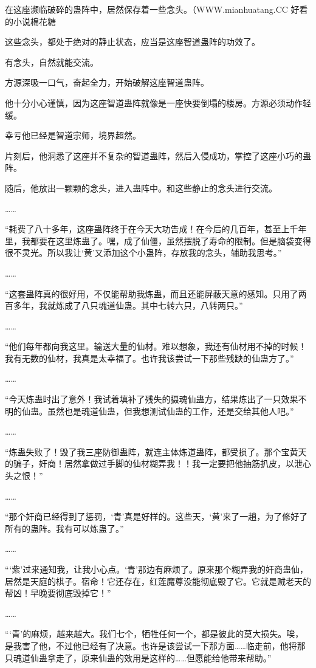 \begin{this_body}
在这座濒临破碎的蛊阵中，居然保存着一些念头。（WWW.mianhuatang.CC 好看的小说棉花糖

这些念头，都处于绝对的静止状态，应当是这座智道蛊阵的功效了。

有念头，自然就能交流。

方源深吸一口气，奋起全力，开始破解这座智道蛊阵。

他十分小心谨慎，因为这座智道蛊阵就像是一座快要倒塌的楼房。方源必须动作轻缓。

幸亏他已经是智道宗师，境界超然。

片刻后，他洞悉了这座并不复杂的智道蛊阵，然后入侵成功，掌控了这座小巧的蛊阵。

随后，他放出一颗颗的念头，进入蛊阵中。和这些静止的念头进行交流。

……

“耗费了八十多年，这座蛊阵终于在今天大功告成！在今后的几百年，甚至上千年里，我都要在这里炼蛊了。嘿，成了仙僵，虽然摆脱了寿命的限制。但是脑袋变得很不灵光。所以我让‘黄’又添加这个小蛊阵，存放我的念头，辅助我思考。”

……

“这套蛊阵真的很好用，不仅能帮助我炼蛊，而且还能屏蔽天意的感知。只用了两百多年，我就炼成了八只魂道仙蛊。其中七转六只，八转两只。”

……

“他们每年都向我这里。输送大量的仙材。难以想象，我还有仙材用不掉的时候！我有无数的仙材，我真是太幸福了。也许我该尝试一下那些残缺的仙蛊方了。”

……

“今天炼蛊时出了意外！我试着填补了残失的摄魂仙蛊方，结果炼出了一只效果不明的仙蛊。虽然也是魂道仙蛊，但我想测试仙蛊的工作，还是交给其他人吧。”

……

“炼蛊失败了！毁了我三座防御蛊阵，就连主体炼道蛊阵，都受损了。那个宝黄天的骗子，奸商！居然拿做过手脚的仙材糊弄我！！我一定要把他抽筋扒皮，以泄心头之恨！”

……

“那个奸商已经得到了惩罚，‘青’真是好样的。这些天，‘黄’来了一趟，为了修好了所有的蛊阵。我有可以炼蛊了。”

……

“‘紫’过来通知我，让我小心点。‘青’那边有麻烦了。原来那个糊弄我的奸商蛊仙，居然是天庭的棋子。宿命！它还存在，红莲魔尊没能彻底毁了它。它就是贼老天的帮凶！早晚要彻底毁掉它！”

……

“‘青’的麻烦，越来越大。我们七个，牺牲任何一个，都是彼此的莫大损失。唉，是我害了他，不过他已经有了决意。也许是该尝试一下那方面……临走前，他将那只魂道仙蛊拿走了，原来仙蛊的效用是这样的……但愿能给他带来帮助。”


\end{this_body}
